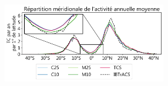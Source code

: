 \documentclass[aspectratio=169, usepdftitle=false, xcolor={dvipsnames}, 9pt,table]{beamer}
\begin{document}
\begin{frame}
\begin{columns}
\begin{column}{0.65\textwidth}
\begin{figure}
            \end{figure}
            \vspace{-0.8em}
            \begin{figure}
                \raggedleft
                \includegraphics[height=3.5cm]{Figures/zonal.png}
            \end{figure}
        \end{column}
    \end{columns}
\end{frame}

\end{document}
